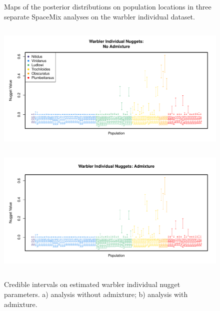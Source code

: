 \documentclass[10pt,letterpaper]{article}
\begin{document}
\begin{figure}
	\caption{Maps of the posterior distributions on population locations in three separate SpaceMix analyses on the warbler individual dataset.}\label{sfig:warb_ind_clouds}
\end{figure}

\begin{figure}
\centering
	\subcaptionbox{\label{warb_ind_noad_nugg}}
		{\includegraphics[width=5in,height=2.5in]{../figs/warblers/warb_ind_NoAd_nugget.pdf}}
	\subcaptionbox{\label{warb_ind_ad_nugg}}
		{\includegraphics[width=5in,height=2.5in]{../figs/warblers/warb_ind_Ad_nugget.pdf}}
	\caption{Credible intervals on estimated warbler individual nugget parameters.  a) analysis without admixture; b) analysis with admixture.}\label{sfig:warb_ind_nugg}
\end{figure}
\end{document}
